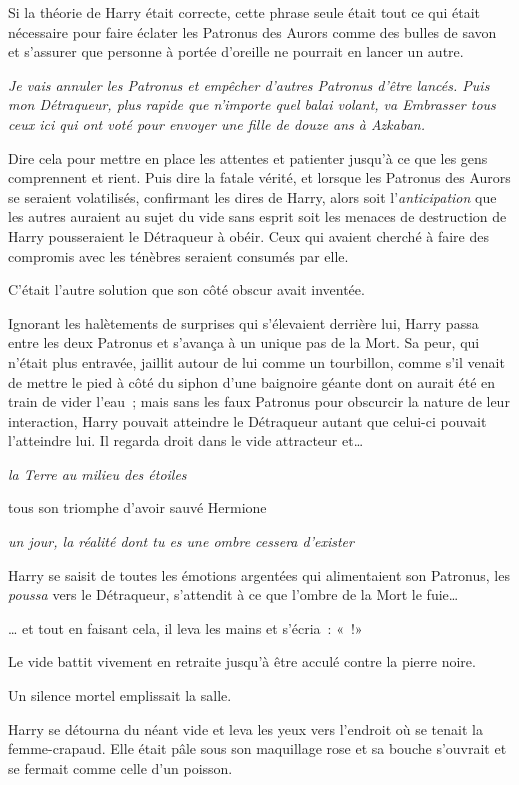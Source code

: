 Si la théorie de Harry était correcte, cette phrase seule était tout ce qui était nécessaire pour faire éclater les Patronus des Aurors comme des bulles de savon et s'assurer que personne à portée d'oreille ne pourrait en lancer un autre.

\emph{Je vais annuler les Patronus et empêcher d'autres Patronus d'être lancés. Puis mon Détraqueur, plus rapide que n'importe quel balai volant, va Embrasser tous ceux ici qui ont voté pour envoyer une fille de douze ans à Azkaban.}

Dire cela pour mettre en place les attentes et patienter jusqu'à ce que les gens comprennent et rient. Puis dire la fatale vérité, et lorsque les Patronus des Aurors se seraient volatilisés, confirmant les dires de Harry, alors soit l'\emph{anticipation} que les autres auraient au sujet du vide sans esprit soit les menaces de destruction de Harry pousseraient le Détraqueur à obéir. Ceux qui avaient cherché à faire des compromis avec les ténèbres seraient consumés par elle.

C'était l'autre solution que son côté obscur avait inventée.

Ignorant les halètements de surprises qui s'élevaient derrière lui, Harry passa entre les deux Patronus et s'avança à un unique pas de la Mort. Sa peur, qui n'était plus entravée, jaillit autour de lui comme un tourbillon, comme s'il venait de mettre le pied à côté du siphon d'une baignoire géante dont on aurait été en train de vider l'eau~; mais sans les faux Patronus pour obscurcir la nature de leur interaction, Harry pouvait atteindre le Détraqueur autant que celui-ci pouvait l'atteindre lui. Il regarda droit dans le vide attracteur et…

\emph{la Terre au milieu des étoiles}

tous son triomphe d'avoir sauvé Hermione

\emph{un jour, la réalité dont tu es une ombre cessera d'exister}

Harry se saisit de toutes les émotions argentées qui alimentaient son Patronus, les \emph{poussa} vers le Détraqueur, s'attendit à ce que l'ombre de la Mort le fuie…

… et tout en faisant cela, il leva les mains et s'écria~: «~!»

Le vide battit vivement en retraite jusqu'à être acculé contre la pierre noire.

Un silence mortel emplissait la salle.

Harry se détourna du néant vide et leva les yeux vers l'endroit où se tenait la femme-crapaud. Elle était pâle sous son maquillage rose et sa bouche s'ouvrait et se fermait comme celle d'un poisson.

